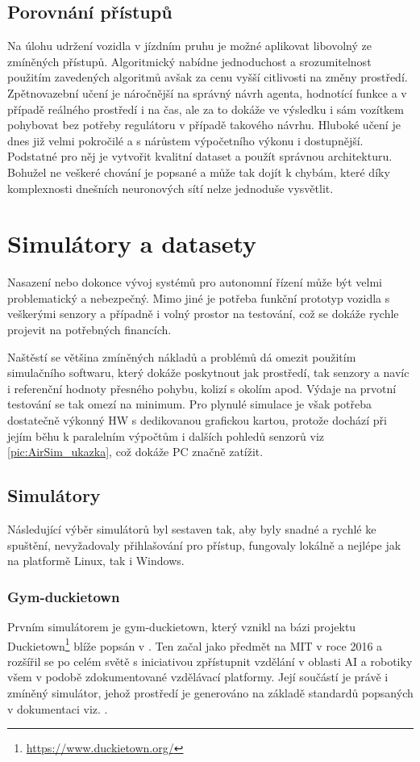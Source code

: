 \documentclass[czech, bc, kky, he, iso690numb]{fasthesis}
\begin{document}
    	\section{Porovnání přístupů}
    		Na úlohu udržení vozidla v jízdním pruhu je možné aplikovat libovolný ze zmíněných přístupů. Algoritmický nabídne jednoduchost a srozumitelnost použitím zavedených algoritmů avšak za cenu vyšší citlivosti na změny prostředí. Zpětnovazební učení je náročnější na správný návrh agenta, hodnotící funkce a v případě reálného prostředí i na čas, ale za to dokáže ve výsledku i sám vozítkem pohybovat bez potřeby regulátoru v případě takového návrhu. Hluboké učení je dnes již velmi pokročilé a s nárůstem výpočetního výkonu i dostupnější. Podstatné pro něj je vytvořit kvalitní dataset a použít správnou architekturu. Bohužel ne veškeré chování je popsané a může tak dojít k chybám, které díky komplexnosti dnešních neuronových sítí nelze jednoduše vysvětlit.
    \chapter{Simulátory a datasety}\label{chap:simulatory}
    	Nasazení nebo dokonce vývoj systémů pro autonomní řízení může být velmi problematický a nebezpečný. Mimo jiné je potřeba funkční prototyp vozidla s veškerými senzory a případně i volný prostor na testování, což se dokáže rychle projevit na potřebných financích.
    	
    	Naštěstí se většina zmíněných nákladů a problémů dá omezit použitím simulačního softwaru, který dokáže poskytnout jak prostředí, tak senzory a navíc i referenční hodnoty přesného pohybu, kolizí s okolím apod. Výdaje na prvotní testování se tak omezí na minimum. Pro plynulé simulace je však potřeba dostatečně výkonný HW s dedikovanou grafickou kartou, protože dochází při jejím běhu k paralelním výpočtům i dalších pohledů senzorů viz \ref{pic:AirSim_ukazka}, což dokáže PC značně zatížit.
    	\section{Simulátory}
    		Následující výběr simulátorů byl sestaven tak, aby byly snadné a rychlé ke spuštění, nevyžadovaly přihlašování pro přístup, fungovaly lokálně a nejlépe jak na platformě Linux, tak i Windows.
    		\subsection{Gym-duckietown}
    			Prvním simulátorem je gym-duckietown, který vznikl na bázi projektu Duckietown\footnote{\href{https://www.duckietown.org/}{https://www.duckietown.org/}} blíže popsán v \cite{Duckietown}. Ten začal jako předmět na MIT v roce 2016 a rozšířil se po celém světě s iniciativou zpřístupnit vzdělání v oblasti AI a robotiky všem v podobě zdokumentované vzdělávací platformy. Její součástí je právě i zmíněný simulátor, jehož prostředí je generováno na základě standardů popsaných v dokumentaci viz. \cite{duckietown_documentation}.
    			
\end{document}
